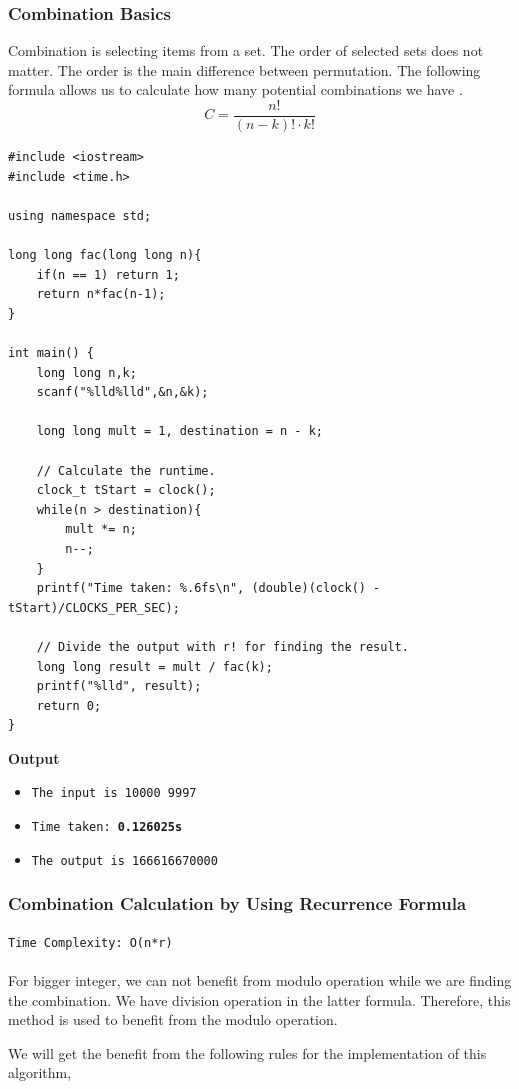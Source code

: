 \documentclass[12pt]{article}
\begin{document}
\subsubsection{Combination Basics}
Combination is selecting items from a set. The order of selected sets does not matter. The order is the main difference between permutation. The following formula allows us to calculate how many potential combinations we have \cite{combinationbasic}.
\[C =\frac{n!}{(n-k)! \cdot k!} \]
\begin{verbatim}
#include <iostream>
#include <time.h>

using namespace std;

long long fac(long long n){
    if(n == 1) return 1;
    return n*fac(n-1);
}

int main() {
    long long n,k;
    scanf("%lld%lld",&n,&k);
    
    long long mult = 1, destination = n - k;
    
    // Calculate the runtime.
    clock_t tStart = clock();
    while(n > destination){
        mult *= n;
        n--;
    }
    printf("Time taken: %.6fs\n", (double)(clock() - tStart)/CLOCKS_PER_SEC);
    
    // Divide the output with r! for finding the result.
    long long result = mult / fac(k);
    printf("%lld", result);
    return 0;
}
\end{verbatim}
\textbf{Output}
\begin{itemize}
  \item \texttt{The input is 10000 9997} 
  \item \texttt{Time taken: \textbf{0.126025s}} 
  \item \texttt{The output is 166616670000}
\end{itemize}
\clearpage
\subsubsection{Combination Calculation by Using Recurrence Formula}
\texttt{Time Complexity: O(n*r) } \\ \\
For bigger integer, we can not benefit from modulo operation while we are finding the combination. We have division operation in the latter formula. Therefore, this method is used to benefit from the modulo operation. 

We will get the benefit from the following rules for the implementation of this algorithm,
\end{document}
